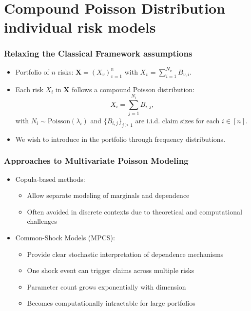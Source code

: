 \documentclass[11pt,xcolor={dvipsnames},hyperref={pdftex,pdfpagemode=UseNone,hidelinks,pdfdisplaydoctitle=true},usepdftitle=false]{beamer}
\begin{document}
\section{Compound Poisson Distribution individual risk models}
\begin{frame}
\frametitle{Relaxing the Classical Framework assumptions}
\begin{itemize}
    \item Portfolio of $n$  risks: $\boldsymbol{X} = (X_v)_{v=1}^{n}$ with $X_v = \sum_{i=1}^{N_v} B_{v,i}$.

    \vfill

    \item Each risk $X_i$ in $\boldsymbol{X}$ follows a compound Poisson distribution: 
        \begin{equation*}
        X_i = \sum_{j=1}^{N_i} B_{i,j},
        \end{equation*}
        with $N_i \sim \text{Poisson}(\lambda_i)$ and $ \{B_{i,j}\}_{j \ge 1}$ are i.i.d. claim sizes for each $i \in [n]$.
    

        \pause

        \vfill

    \item We wish to introduce  in the portfolio through frequency distributions.
\end{itemize}

\end{frame}

\begin{frame}
\frametitle{Approaches to Multivariate Poisson Modeling}
\begin{itemize}
        \item Copula-based methods:
        \begin{itemize}
            \item Allow {separate modeling of marginals and dependence}
            \item Often avoided in discrete contexts due to theoretical and computational challenges 
        \end{itemize}
        
        \vfill

        \item Common-Shock Models (MPCS):
        \begin{itemize}
            \item Provide clear stochastic interpretation of dependence mechanisms
            \item One shock event can trigger claims across multiple risks
            \item Parameter count grows exponentially with dimension
            \item Becomes computationally intractable for large portfolios 
        \end{itemize}
\end{itemize}
\end{frame} 
\end{document}
